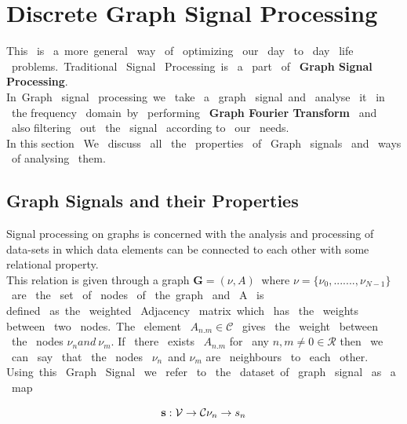 \documentclass[12pt,onecolumn]{article}
\begin{document}
\section{\textbf{Discrete Graph Signal Processing}}
This \ is \ a\ more\ general \ way \ of \ optimizing \ our \ day \ to \ day \ life \ problems.\ Traditional \ Signal \ Processing\ is \  a \ part \ of \ \textbf{Graph Signal Processing}. \\
In\  Graph \ signal \ processing\ we \ take \ a \ graph \ signal\ and \ analyse \ it \ in \ the frequency \ domain\ by \ performing \ \textbf{Graph Fourier Transform} \ and \ also filtering \ out \ the \ signal \ according to \ our \ needs. \\
In this section \ We \ discuss \ all \ the \ properties \ of \ Graph \ signals \ and \ ways \ of analysing \ them. \\ 

\subsection{{\textbf{Graph Signals and their Properties}}}
Signal processing on graphs is concerned with the analysis and processing of data-sets in which data elements can be connected to each other with some relational property.\\
This relation is given through a graph $ {\textbf{G}} = (\nu, A)\ $
\newline
where $ \nu = \{\nu_{0}, .......,\nu_{N-1} \} \ $
\ are \ the \ set \ of \ nodes \ of \ the\ graph \ and \ A \ is \\ defined \ as\ the \ weighted \ Adjacency \ matrix\ which \ has \ the \ weights \\ between \ two \ nodes.\
 The \ element \ $  A_{n.m} \in \mathcal{C} $ \ gives \ the \ weight \ between \ the \ nodes $ \nu_{n} and \ \nu_{m}. $ \newline
 If \ there \ exists \  $ A_{n.m} $ for \ any $ n,m \neq 0 \in \mathcal{R} $ then \ we \ can \ say \  that \ the \ nodes \ $ \nu_{n} $\ and $ \nu_{m}  $ are \ neighbours \ to  \ each \ other. \\
 
 Using\ this \ Graph \ Signal \ we \ refer \ to \ the \ dataset\ of \ graph \ signal \ as \ a \ map 
 

 \begin{equation*}
 \textbf{s} : \mathcal{V} \to \mathcal{C} \\
  {\nu_{n}} \to {s_{n}}
   \end{equation*}
 
\end{document}
